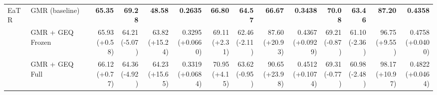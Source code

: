 \documentclass{article}
\begin{document}
{\begin{tabular}{llrrrrrrrrrrrr}
\midrule
EaTR & GMR (baseline) & \textbf{65.35} & \textbf{69.28} & \textbf{48.58} & \textbf{0.2635} & \textbf{66.80} & \textbf{64.57} & \textbf{66.67} & \textbf{0.3438} & \textbf{70.08} & \textbf{63.46} & \textbf{87.20} & \textbf{0.4358} \\
 & GMR + GEQ Frozen & \shortstack{65.93 \\ {\scriptsize\textcolor{Gain}{(+0.58)}}} & \shortstack{64.21 \\ {\scriptsize\textcolor{Loss}{(-5.07)}}} & \shortstack{63.82 \\ {\scriptsize\textcolor{Gain}{(+15.24)}}} & \shortstack{0.3295 \\ {\scriptsize\textcolor{Gain}{(+0.0660)}}} & \shortstack{69.11 \\ {\scriptsize\textcolor{Gain}{(+2.31)}}} & \shortstack{62.46 \\ {\scriptsize\textcolor{Loss}{(-2.11)}}} & \shortstack{87.60 \\ {\scriptsize\textcolor{Gain}{(+20.93)}}} & \shortstack{0.4367 \\ {\scriptsize\textcolor{Gain}{(+0.0929)}}} & \shortstack{69.21 \\ {\scriptsize\textcolor{Loss}{(-0.87)}}} & \shortstack{61.10 \\ {\scriptsize\textcolor{Loss}{(-2.36)}}} & \shortstack{96.75 \\ {\scriptsize\textcolor{Gain}{(+9.55)}}} & \shortstack{0.4758 \\ {\scriptsize\textcolor{Gain}{(+0.0400)}}} \\
 & GMR + GEQ Full & \shortstack{66.12 \\ {\scriptsize\textcolor{Gain}{(+0.77)}}} & \shortstack{64.36 \\ {\scriptsize\textcolor{Loss}{(-4.92)}}} & \shortstack{64.23 \\ {\scriptsize\textcolor{Gain}{(+15.65)}}} & \shortstack{0.3319 \\ {\scriptsize\textcolor{Gain}{(+0.0684)}}} & \shortstack{70.95 \\ {\scriptsize\textcolor{Gain}{(+4.15)}}} & \shortstack{63.62 \\ {\scriptsize\textcolor{Loss}{(-0.95)}}} & \shortstack{90.65 \\ {\scriptsize\textcolor{Gain}{(+23.98)}}} & \shortstack{0.4512 \\ {\scriptsize\textcolor{Gain}{(+0.1074)}}} & \shortstack{69.31 \\ {\scriptsize\textcolor{Loss}{(-0.77)}}} & \shortstack{60.98 \\ {\scriptsize\textcolor{Loss}{(-2.48)}}} & \shortstack{98.17 \\ {\scriptsize\textcolor{Gain}{(+10.97)}}} & \shortstack{0.4822 \\ {\scriptsize\textcolor{Gain}{(+0.0464)}}} \\

\end{tabular}}
\end{document}
